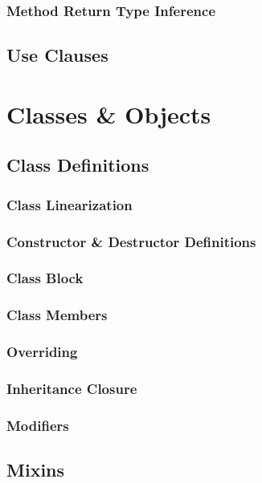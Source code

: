 \subsection{Method Return Type Inference}

\section{Use Clauses}

\chapter{Classes \& Objects}

\section{Class Definitions}

\subsection{Class Linearization}

\subsection{Constructor \& Destructor Definitions}

\subsection{Class Block}

\subsection{Class Members}

\subsection{Overriding}

\subsection{Inheritance Closure}

\subsection{Modifiers}

\section{Mixins}

